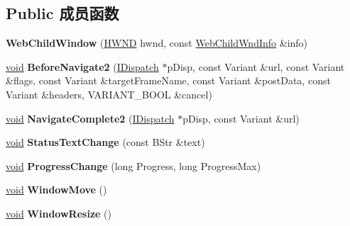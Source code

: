 \subsection*{Public 成员函数}
\begin{DoxyCompactItemize}
\item 
\mbox{\label{struct_web_child_window_aba366f7f4f15a65aa0030491b3b303e6}} 
{\bfseries Web\+Child\+Window} (\hyperlink{interfacevoid}{H\+W\+ND} hwnd, const \hyperlink{struct_web_child_wnd_info}{Web\+Child\+Wnd\+Info} \&info)
\item 
\mbox{\label{struct_web_child_window_a183c929ecdd55a19b44492dbd6176f15}} 
\hyperlink{interfacevoid}{void} {\bfseries Before\+Navigate2} (\hyperlink{interface_i_dispatch}{I\+Dispatch} $\ast$p\+Disp, const Variant \&url, const Variant \&flags, const Variant \&target\+Frame\+Name, const Variant \&post\+Data, const Variant \&headers, V\+A\+R\+I\+A\+N\+T\+\_\+\+B\+O\+OL \&cancel)
\item 
\mbox{\label{struct_web_child_window_a90f1dc3128ad6ae3dc766c2c09b6ceb6}} 
\hyperlink{interfacevoid}{void} {\bfseries Navigate\+Complete2} (\hyperlink{interface_i_dispatch}{I\+Dispatch} $\ast$p\+Disp, const Variant \&url)
\item 
\mbox{\label{struct_web_child_window_a058f1030cef906834294ebe3ec4a2460}} 
\hyperlink{interfacevoid}{void} {\bfseries Status\+Text\+Change} (const B\+Str \&text)
\item 
\mbox{\label{struct_web_child_window_a1a23bd35f8be690d587895709754b171}} 
\hyperlink{interfacevoid}{void} {\bfseries Progress\+Change} (long Progress, long Progress\+Max)
\item 
\mbox{\label{struct_web_child_window_a09da39605e66eb38f5891d95ae34c569}} 
\hyperlink{interfacevoid}{void} {\bfseries Window\+Move} ()
\item 
\mbox{\label{struct_web_child_window_a25e348f61922ffe61bb14b47f740756d}} 
\hyperlink{interfacevoid}{void} {\bfseries Window\+Resize} ()
\item 
\mbox{\label{struct_web_child_window_a1030e888626594824bc2f11f6cf5a5e6}} 

\end{DoxyCompactItemize}
